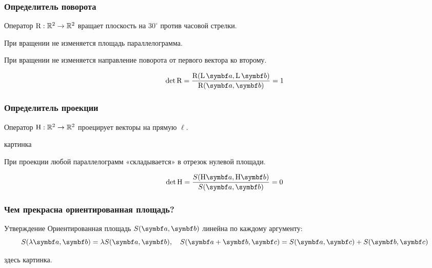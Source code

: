 \begin{frame}
    \frametitle{Определитель поворота}


    Оператор $\mathrm{R}: \mathbb{R}^2 \to \mathbb{R}^2$ вращает плоскость на $30^{\circ}$ против часовой стрелки.

    \pause

    При вращении не изменяется площадь параллелограмма.

    При вращении не изменяется направление поворота от первого вектора ко второму.

    \pause

    \[
    \det \Rot = \frac{\Rot(\LL \ba, \LL \bb )}{\Rot(\ba, \bb )} = 1     
    \]

\end{frame}





\begin{frame}
    \frametitle{Определитель проекции}


    Оператор $\mathrm{H}: \mathbb{R}^2 \to \mathbb{R}^2$ проецирует векторы на прямую $\ell$.  



    картинка


    \pause

    При проекции любой параллелограмм «складывается» в отрезок нулевой площади.

    \pause

    \[
    \det \HH = \frac{S(\HH \ba, \HH \bb )}{S(\ba, \bb )} = 0     
    \]

\end{frame}



\begin{frame}
    \frametitle{Чем прекрасна ориентированная площадь?}

    \begin{block}{Утверждение}
        Ориентированная площадь $S(\ba, \bb)$ линейна по каждому аргументу:
        \[
        S(\lambda \ba, \bb) = \lambda S(\ba, \bb), \quad S(\ba + \bb, \bc) = S(\ba, \bc) + S(\bb, \bc)    
        \]
    \end{block}

    \pause

    здесь картинка.

    

\end{frame}



